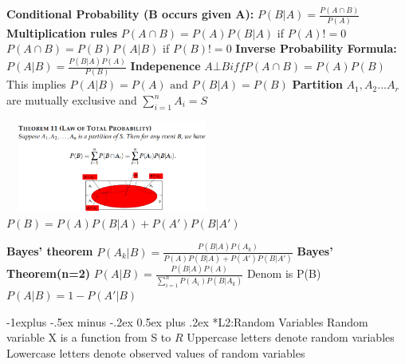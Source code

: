 \documentclass[10pt, landscape]{article}
\makeatletter
\renewcommand{\subsection}{\@startsection{subsection}{2}{0mm}%
                                {-1explus -.5ex minus -.2ex}%
                                {0.5ex plus .2ex}%
                                {\normalfont\normalsize\bfseries}}
\makeatother
\begin{document}
\begin{multicols}{4}
\textbf{Conditional Probability (B occurs given A):} $P(B|A)=\frac{P(A\cap B)}{P(A)}$ \newline
\textbf{Multiplication rules} \newline
 $P(A\cap B)=P(A)P(B|A)$ if $P(A)!=0$ \newline
$P(A\cap B)=P(B)P(A|B)$ if $P(B)!=0$ \newline
\textbf{Inverse Probability Formula:} $P(A|B)=\frac{P(B|A)P(A)}{P(B)}$ \newline
\textbf{Indepenence} $A\bot B iff P(A \cap B)=P(A)P(B)$ This implies $P(A|B)=P(A) \text{ and } P(B|A)=P(B)$ \newline
\textbf{Partition} $A_1,A_2...A_r$ are mutually exclusive and $\sum_{i=1}^{n}A_i=S$ \newline

\includegraphics[width=7cm, height=3cm]{lotp.png}
$P(B)=P(A)P(B|A)+P(A')P(B|A')$ \newline

\textbf{Bayes' theorem} $P(A_k|B)=\frac{P(B|A)P(A_k)}{P(A)P(B|A)+P(A')P(B|A')}$ \newline
\textbf{Bayes' Theorem(n=2)} $P(A|B)=\frac{P(B|A)P(A)}{\sum_{i=1}^{n}P(A_i)P(B|A_k)}$ Denom is P(B) \newline
\textbf{$P(A|B)=1-P(A'|B)$} \newline


\subsection*{L2:Random Variables}
Random variable X is a function from S to $R$ \newline
Uppercase letters denote random variables \newline
Lowercase letters denote observed values of random variables \newline


\end{multicols}
\end{document}

